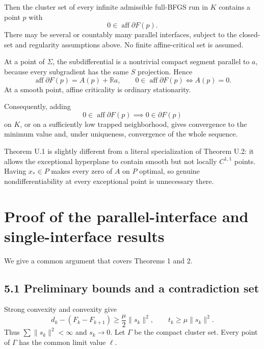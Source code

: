 Then the cluster set of every infinite admissible full-BFGS run in \(K\)
contains a point \(p\) with \[
 \boxed{0\in\operatorname{aff}\partial F(p).}
\] There may be several or countably many parallel interfaces, subject
to the closed-set and regularity assumptions above. No finite
affine-critical set is assumed.

At a point of \(\Sigma\), the subdifferential is a nontrivial compact
segment parallel to \(a\), because every subgradient has the same \(S\)
projection. Hence \[
 \operatorname{aff}\partial F(p)=A(p)+\mathbb R a,
 \qquad
 0\in\operatorname{aff}\partial F(p)\iff A(p)=0.
\] At a smooth point, affine criticality is ordinary stationarity.

Consequently, adding \[
 0\in\operatorname{aff}\partial F(p)\implies0\in\partial F(p)
\] on \(K\), or on a sufficiently low trapped neighborhood, gives
convergence to the minimum value and, under uniqueness, convergence of
the whole sequence.

Theorem U.1 is slightly different from a literal specialization of Theorem U.2: it allows the exceptional hyperplane to contain smooth but not
locally \(C^{1,1}\) points. Having \(x_*\in P\) makes every zero of
\(A\) on \(P\) optimal, so genuine nondifferentiability at every
exceptional point is unnecessary there.


\setcounter{section}{4}
\setcounter{theorem}{0}
\setcounter{lemma}{0}
\setcounter{corollary}{0}
\setcounter{proposition}{0}
\setcounter{remark}{0}
\setcounter{equation}{0}
\section{Proof of the parallel-interface and single-interface
results}\label{U:proof-of-the-parallel-interface-and-single-interface-results}

We give a common argument that covers Theorems 1 and 2.

\subsection{5.1 Preliminary bounds and a contradiction
set}\label{U:preliminary-bounds-and-a-contradiction-set}

Strong convexity and convexity give \[
 d_k-(F_k-F_{k+1})\ge\frac\mu2\|s_k\|^2,
 \qquad t_k\ge\mu\|s_k\|^2.\tag{U.10}
\] Thus \(\sum\|s_k\|^2<\infty\) and \(s_k\to0\). Let \(\Gamma\) be the
compact cluster set. Every point of \(\Gamma\) has the common limit
value \(\ell\).

